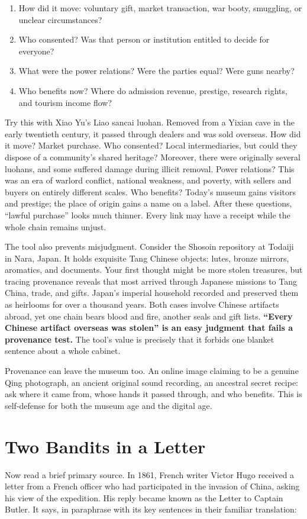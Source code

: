 \begin{enumerate}
\item How did it move: voluntary gift, market transaction, war booty, smuggling, or unclear circumstances?
\item Who consented? Was that person or institution entitled to decide for everyone?
\item What were the power relations? Were the parties equal? Were guns nearby?
\item Who benefits now? Where do admission revenue, prestige, research rights, and tourism income flow?
\end{enumerate}
Try this with Xiao Yu's Liao sancai luohan. Removed from a Yixian cave in the early twentieth century, it passed through dealers and was sold overseas. How did it move? Market purchase. Who consented? Local intermediaries, but could they dispose of a community's shared heritage? Moreover, there were originally several luohans, and some suffered damage during illicit removal. Power relations? This was an era of warlord conflict, national weakness, and poverty, with sellers and buyers on entirely different scales. Who benefits? Today's museum gains visitors and prestige; the place of origin gains a name on a label. After these questions, ``lawful purchase'' looks much thinner. Every link may have a receipt while the whole chain remains unjust.

The tool also prevents misjudgment. Consider the Shosoin repository at Todaiji in Nara, Japan. It holds exquisite Tang Chinese objects: lutes, bronze mirrors, aromatics, and documents. Your first thought might be more stolen treasures, but tracing provenance reveals that most arrived through Japanese missions to Tang China, trade, and gifts. Japan's imperial household recorded and preserved them as heirlooms for over a thousand years. Both cases involve Chinese artifacts abroad, yet one chain bears blood and fire, another seals and gift lists. \textbf{``Every Chinese artifact overseas was stolen'' is an easy judgment that fails a provenance test.} The tool's value is precisely that it forbids one blanket sentence about a whole cabinet.

Provenance can leave the museum too. An online image claiming to be a genuine Qing photograph, an ancient original sound recording, an ancestral secret recipe: ask where it came from, whose hands it passed through, and who benefits. This is self-defense for both the museum age and the digital age.

\section{Two Bandits in a Letter}
Now read a brief primary source. In 1861, French writer Victor Hugo received a letter from a French officer who had participated in the invasion of China, asking his view of the expedition. His reply became known as the Letter to Captain Butler. It says, in paraphrase with its key sentences in their familiar translation:

